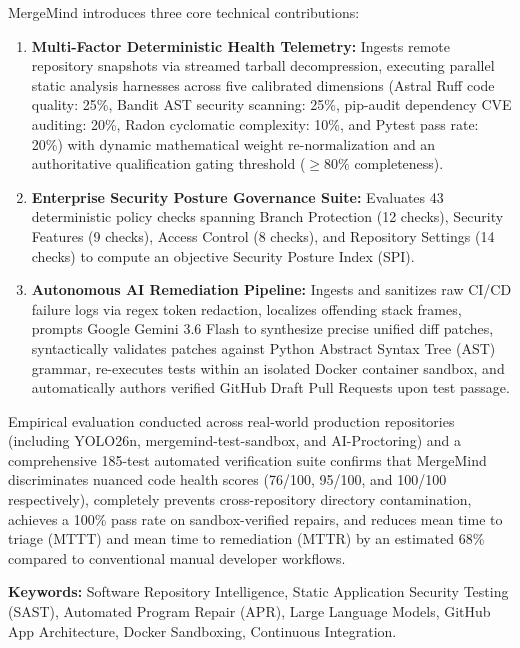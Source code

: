 \documentclass[12pt,a4paper,oneside]{report}
\begin{document}
\vspace{0.4cm}
MergeMind introduces three core technical contributions:
\begin{enumerate}
    \item \textbf{Multi-Factor Deterministic Health Telemetry:} Ingests remote repository snapshots via streamed tarball decompression, executing parallel static analysis harnesses across five calibrated dimensions (Astral Ruff code quality: 25\%, Bandit AST security scanning: 25\%, pip-audit dependency CVE auditing: 20\%, Radon cyclomatic complexity: 10\%, and Pytest pass rate: 20\%) with dynamic mathematical weight re-normalization and an authoritative qualification gating threshold ($\ge 80\%$ completeness).
    \item \textbf{Enterprise Security Posture Governance Suite:} Evaluates 43 deterministic policy checks spanning Branch Protection (12 checks), Security Features (9 checks), Access Control (8 checks), and Repository Settings (14 checks) to compute an objective Security Posture Index (SPI).
    \item \textbf{Autonomous AI Remediation Pipeline:} Ingests and sanitizes raw CI/CD failure logs via regex token redaction, localizes offending stack frames, prompts Google Gemini 3.6 Flash to synthesize precise unified diff patches, syntactically validates patches against Python Abstract Syntax Tree (AST) grammar, re-executes tests within an isolated Docker container sandbox, and automatically authors verified GitHub Draft Pull Requests upon test passage.
\end{enumerate}

\vspace{0.4cm}
Empirical evaluation conducted across real-world production repositories (including YOLO26n, mergemind-test-sandbox, and AI-Proctoring) and a comprehensive 185-test automated verification suite confirms that MergeMind discriminates nuanced code health scores (76/100, 95/100, and 100/100 respectively), completely prevents cross-repository directory contamination, achieves a 100\% pass rate on sandbox-verified repairs, and reduces mean time to triage (MTTT) and mean time to remediation (MTTR) by an estimated 68\% compared to conventional manual developer workflows.

\vspace{0.6cm}
\noindent\textbf{Keywords:} Software Repository Intelligence, Static Application Security Testing (SAST), Automated Program Repair (APR), Large Language Models, GitHub App Architecture, Docker Sandboxing, Continuous Integration.
\end{document}
